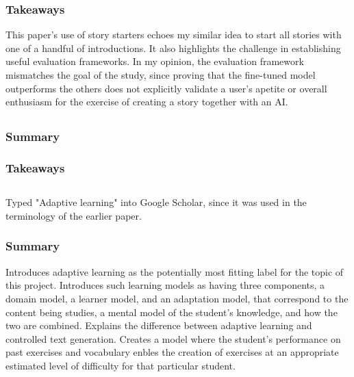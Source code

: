 \documentclass[
	letterpaper, %
]{jdf}
\begin{document}
\subsubsection{Takeaways}
This paper's use of story starters echoes my similar idea to start all stories with one of a handful of introductions. It also highlights the challenge in establishing useful evaluation frameworks. In my opinion, the evaluation framework mismatches the goal of the study, since proving that the fine-tuned model outperforms the others does not explicitly validate a user's apetite or overall enthusiasm for the exercise of creating a story together with an AI.

 \subsection{}


\subsubsection{Summary}


\subsubsection{Takeaways}

\subsection{}
Typed "Adaptive learning" into Google Scholar, since it was used in the terminology of the earlier paper.

\subsubsection{Summary}
Introduces adaptive learning as the potentially most fitting label for the topic of this project. Introduces such learning models as having three components, a domain model, a learner model, and an adaptation model, that correspond to the content being studies, a mental model of the student's knowledge, and how the two are combined. Explains the difference between adaptive learning and controlled text generation. Creates a model where the student's performance on past exercises and vocabulary enbles the creation of exercises at an appropriate estimated level of difficulty for that particular student.
\end{document}
